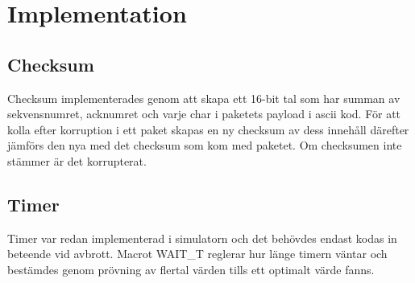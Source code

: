 \section{Implementation}
\subsection{Checksum}
Checksum implementerades genom att skapa ett 16-bit tal som har summan av sekvensnumret, acknumret
och varje char i paketets payload i ascii kod. För att kolla efter korruption i ett paket skapas en
ny checksum av dess innehåll därefter jämförs den nya med det checksum som kom  med paketet. Om
checksumen inte stämmer är det korrupterat. 
\subsection{Timer}
Timer var redan implementerad i simulatorn och det behövdes endast kodas in beteende vid avbrott. Macrot WAIT\_T reglerar hur länge timern väntar och bestämdes genom prövning av flertal värden tills ett optimalt värde fanns.
